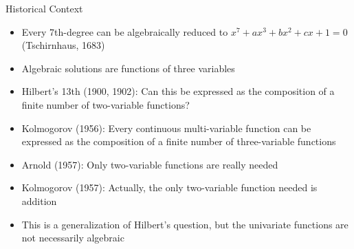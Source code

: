 

\begin{frame}{Historical Context}

\begin{itemize}
\item Every 7th-degree can be algebraically reduced to
  $x^{7}+ax^{3}+bx^{2}+cx+1=0$ (Tschirnhaus, 1683)
\item Algebraic solutions are functions of three variables
\item Hilbert's 13th (1900, 1902):
  Can this be expressed as the composition of a finite number
  of two-variable functions?
\item Kolmogorov (1956): Every continuous multi-variable function
  can be expressed as the composition of a finite number of
  three-variable functions \vspace{0.3em}
\item Arnold (1957): Only two-variable functions are really needed \vspace{0.3em}
\item Kolmogorov (1957): Actually, the only two-variable function
  needed is addition \vspace{0.3em}
\item This is a generalization of Hilbert's question, but the
  univariate functions are not necessarily algebraic
\end{itemize}

\end{frame}



